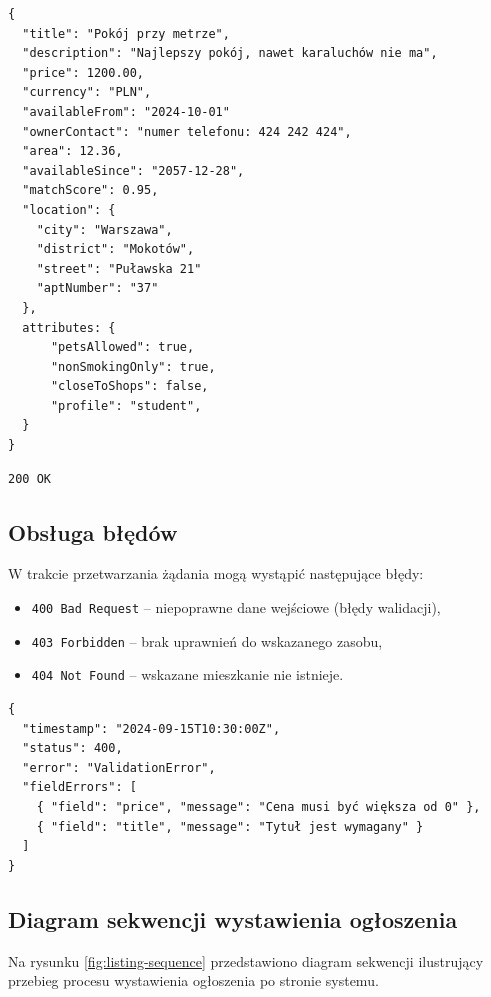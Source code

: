 \documentclass[11pt, a4paper]{article}
\begin{document}
\begin{lstlisting}[style=json,caption={Ciało żądania — pobranie szczegółów ogłoszenia}]
{
  "title": "Pokój przy metrze",
  "description": "Najlepszy pokój, nawet karaluchów nie ma",
  "price": 1200.00,
  "currency": "PLN",
  "availableFrom": "2024-10-01"
  "ownerContact": "numer telefonu: 424 242 424",
  "area": 12.36,
  "availableSince": "2057-12-28",
  "matchScore": 0.95,
  "location": {
    "city": "Warszawa",
    "district": "Mokotów",
    "street": "Puławska 21"
    "aptNumber": "37"
  },
  attributes: {
      "petsAllowed": true,
      "nonSmokingOnly": true,
      "closeToShops": false,
      "profile": "student",
  }
}
\end{lstlisting}

\begin{lstlisting}[style=http,caption={Odpowiedź HTTP — sukces}]
200 OK
\end{lstlisting}

\subsection{Obsługa błędów}

W trakcie przetwarzania żądania mogą wystąpić następujące błędy:

\begin{itemize}
    \item \texttt{400 Bad Request} – niepoprawne dane wejściowe (błędy walidacji),
    \item \texttt{403 Forbidden} – brak uprawnień do wskazanego zasobu,
    \item \texttt{404 Not Found} – wskazane mieszkanie nie istnieje.
\end{itemize}

\begin{lstlisting}[style=json,caption={Przykładowa odpowiedź — błąd walidacji}]
{
  "timestamp": "2024-09-15T10:30:00Z",
  "status": 400,
  "error": "ValidationError",
  "fieldErrors": [
    { "field": "price", "message": "Cena musi być większa od 0" },
    { "field": "title", "message": "Tytuł jest wymagany" }
  ]
}
\end{lstlisting}

\subsection{Diagram sekwencji wystawienia ogłoszenia}

Na rysunku \ref{fig:listing-sequence} przedstawiono diagram sekwencji
ilustrujący przebieg procesu wystawienia ogłoszenia po stronie systemu.
\end{document}
